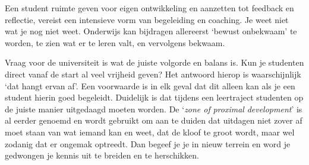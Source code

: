 \documentclass[smallauthor, chapterhaspagenum, nochapterinheader, pagenuminheader,  bigchapnum,medium2, tocpages,  garamond, titleinheader]{jote-book}
\begin{document}
	Een student ruimte geven voor eigen ontwikkeling en aanzetten tot feedback en reflectie, vereist een intensieve vorm van begeleiding en coaching. Je weet niet wat je nog niet weet. Onderwijs kan bijdragen allereerst ‘bewust onbekwaam' te worden, te zien wat er te leren valt, en vervolgens bekwaam.



	Vraag voor de universiteit is wat de juiste volgorde en balans is. Kun je studenten direct vanaf de start al veel vrijheid geven? Het antwoord hierop is waarschijnlijk ‘dat hangt ervan af'. Een voorwaarde is in elk geval dat dit alleen kan als je een student hierin goed begeleidt. Duidelijk is dat tijdens een leertraject studenten op de juiste manier uitgedaagd moeten worden. De ‘\emph{zone of }\emph{proximal}\emph{ development}' is al eerder genoemd en wordt gebruikt om aan te duiden dat uitdagen niet zover af moet staan van wat iemand kan en weet, dat de kloof te groot wordt, maar wel zodanig dat er ongemak optreedt. Dan begeef je je in nieuw terrein en word je gedwongen je kennis uit te breiden en te herschikken.
\end{document}
